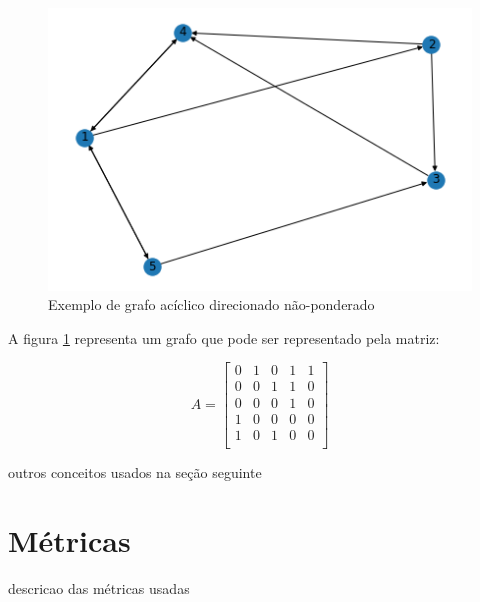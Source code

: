 \begin{figure}[htb]
 \caption{Exemplo de grafo acíclico direcionado não-ponderado}
 \label{fig:redes1:grafo-exemplo}
 \centering
 \includegraphics[scale=0.7]{images/redes-1-grafo-exemplo.png}
 \fautor
\end{figure}

A figura \ref{fig:redes1:grafo-exemplo} representa um grafo que pode ser representado pela matriz:

\begin{equation}
A = \begin{bmatrix}
0 & 1 & 0 & 1 & 1 \\
0 & 0 & 1 & 1 & 0 \\
0 & 0 & 0 & 1 & 0 \\
1 & 0 & 0 & 0 & 0 \\
1 & 0 & 1 & 0 & 0 \\
\end{bmatrix}
\end{equation}

outros conceitos usados na seção seguinte

\section{Métricas}
\label{section:redes:metricas}

descricao das métricas usadas
